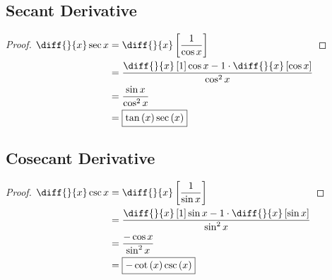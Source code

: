 \documentclass{article}
\begin{document}
\subsection{Secant Derivative}
\label{proof:secderivative}
\begin{proof}
	$\begin{aligned}[t]
		\diff{}{x}\sec x&=\diff{}{x}\left[\frac{1}{\cos x}\right] \\
		&=\frac{\diff{}{x}\left[1\right]\cos x-1\cdot\diff{}{x}
			\left[\cos x\right]}{\cos^2x} \\
		&=\frac{\sin x}{\cos^2x} \\
		&=\boxed{\tan\left(x\right)\sec\left(x\right)} \\
	\end{aligned} \\$
\end{proof}

\subsection{Cosecant Derivative}
\label{proof:cscderivative}
\begin{proof}
	$\begin{aligned}[t]
		\diff{}{x}\csc x&=\diff{}{x}\left[\frac{1}{\sin x}\right] \\
		&=\frac{\diff{}{x}\left[1\right]\sin x-1\cdot\diff{}{x}
			\left[\sin x\right]}{\sin^2x} \\
		&=\frac{-\cos x}{\sin^2x} \\
		&=\boxed{-\cot\left(x\right)\csc\left(x\right)} \\
	\end{aligned} \\$
\end{proof}
\end{document}
